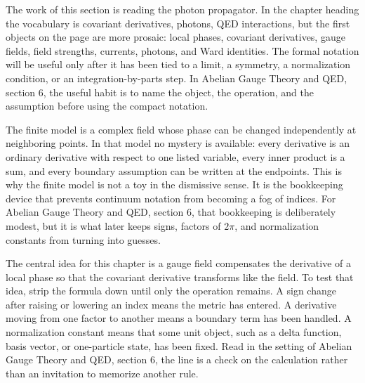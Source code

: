 











The work of this section is reading the photon propagator.  In the chapter heading the vocabulary is covariant derivatives, photons, QED interactions, but the first objects on the page are more prosaic: local phases, covariant derivatives, gauge fields, field strengths, currents, photons, and Ward identities.  The formal notation will be useful only after it has been tied to a limit, a symmetry, a normalization condition, or an integration-by-parts step.  In Abelian Gauge Theory and QED, section 6, the useful habit is to name the object, the operation, and the assumption before using the compact notation.

The finite model is a complex field whose phase can be changed independently at neighboring points.  In that model no mystery is available: every derivative is an ordinary derivative with respect to one listed variable, every inner product is a sum, and every boundary assumption can be written at the endpoints.  This is why the finite model is not a toy in the dismissive sense.  It is the bookkeeping device that prevents continuum notation from becoming a fog of indices.  For Abelian Gauge Theory and QED, section 6, that bookkeeping is deliberately modest, but it is what later keeps signs, factors of \(2\pi\), and normalization constants from turning into guesses.

The central idea for this chapter is a gauge field compensates the derivative of a local phase so that the covariant derivative transforms like the field.  To test that idea, strip the formula down until only the operation remains.  A sign change after raising or lowering an index means the metric has entered.  A derivative moving from one factor to another means a boundary term has been handled.  A normalization constant means that some unit object, such as a delta function, basis vector, or one-particle state, has been fixed.  Read in the setting of Abelian Gauge Theory and QED, section 6, the line is a check on the calculation rather than an invitation to memorize another rule.

